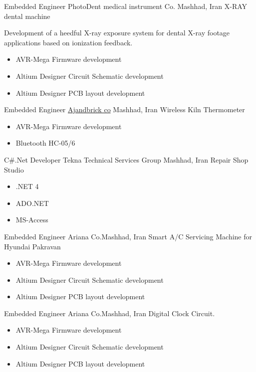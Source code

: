 	{Embedded Engineer}
	{PhotoDent medical instrument Co.}
        {Mashhad, Iran}
	{
         \newline
         X-RAY dental machine
         }
        { Development of a heedful X-ray exposure system for dental X-ray footage applications based on ionization feedback.
        \begin{itemize}
            \item AVR-Mega Firmware development
            \item Altium Designer Circuit Schematic development
            \item Altium Designer  PCB layout development 
        \end{itemize}
        }
	{Embedded Engineer}
	{\href{http://ajandbrick.co/}{\color{blue}Ajandbrick co}}
        {Mashhad, Iran}
	{
         \newline
         Wireless Kiln Thermometer}
         {
         \begin{itemize}
             \item AVR-Mega Firmware development
             \item Bluetooth HC-05/6
         \end{itemize}
         }

	{C\#.Net Developer}
	{Tekna Technical Services Group}
        {Mashhad, Iran}
	{ \newline
         Repair Shop Studio
        }
        {
        \begin{itemize}
           \item .NET 4
           \item ADO.NET 
           \item MS-Access
        \end{itemize}
        }


	{Embedded Engineer}
	{Ariana Co.}{Mashhad, Iran}
	{
         \newline
        Smart A/C Servicing Machine for Hyundai Pakravan
        }
        {\begin{itemize}
            \item AVR-Mega Firmware development
            \item Altium Designer Circuit Schematic development
            \item Altium Designer  PCB layout development 
        \end{itemize}}


	{Embedded Engineer}
	{Ariana Co.}{Mashhad, Iran}
	{
        \newline 
        Digital Clock Circuit.
        }
        {
        \begin{itemize}
            \item AVR-Mega Firmware development
            \item Altium Designer Circuit Schematic development
            \item Altium Designer  PCB layout development 
        \end{itemize}
        }

